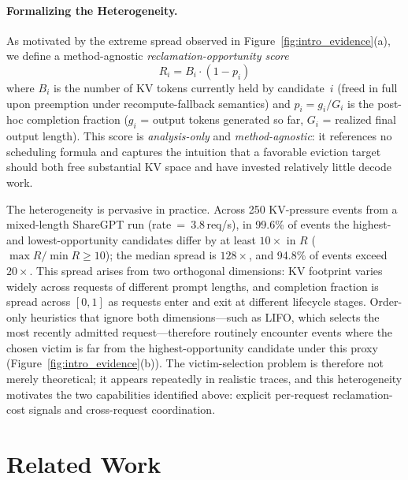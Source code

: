 \documentclass[sigconf,nonacm]{acmart}
\begin{document}
\paragraph{Formalizing the Heterogeneity.}
As motivated by the extreme spread observed in
Figure~\ref{fig:intro_evidence}(a), we define a method-agnostic
\emph{reclamation-opportunity score}
\begin{equation}
R_i = B_i \cdot (1 - p_i)
\label{eq:reclamation_opportunity}
\end{equation}
where $B_i$ is the number of KV tokens currently held by candidate~$i$
(freed in full upon preemption under recompute-fallback semantics) and
$p_i = g_i / G_i$ is the post-hoc completion fraction ($g_i$ = output tokens
generated so far, $G_i$ = realized final output length).  This score is
\emph{analysis-only} and \emph{method-agnostic}: it references no scheduling
formula and captures the intuition that a favorable eviction target should both
free substantial KV space and have invested relatively little decode work.

The heterogeneity is pervasive in practice.  Across 250 KV-pressure events
from a mixed-length ShareGPT run (rate~=~3.8\,req/s), in 99.6\% of events the
highest- and lowest-opportunity candidates differ by at least $10{\times}$ in
$R$ ($\max R / \min R \geq 10$); the median spread is $128{\times}$, and
94.8\% of events exceed $20{\times}$.  This spread arises from two orthogonal
dimensions: KV footprint varies widely across requests of different prompt
lengths, and completion fraction is spread across $[0,1]$ as requests enter
and exit at different lifecycle stages.  Order-only heuristics that ignore both
dimensions---such as LIFO, which selects the most recently admitted
request---therefore routinely encounter events where the chosen victim is far
from the highest-opportunity candidate under this proxy
(Figure~\ref{fig:intro_evidence}(b)).  The victim-selection problem is
therefore not merely theoretical; it appears repeatedly in realistic traces,
and this heterogeneity motivates the two capabilities identified above:
explicit per-request reclamation-cost signals and cross-request coordination.

\section{Related Work}\label{sec:related}
\end{document}
